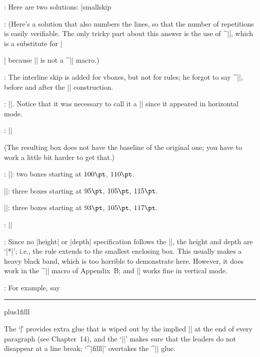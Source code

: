 {{{{{{{{{{{{{:
 Here are two solutions:
\begintt
\def\next#1\endname{\uppercase{\def\MYNAME{#1}}}
\expandafter\next\myname\endname
|smallskip\edef\next{\def\noexpand\MYNAME{\myname}}
\uppercase\expandafter{\next}
\endtt

:
 (Here's a solution that also numbers the lines, so that the number of
repetitions is easily verifiable.
The only tricky part about this answer is the use of\/ ^|\endgraf|,
which is a substitute for |\par| because |\loop| is not a ^|\long| macro.)
\begintt
\newcount\n
\def\punishment#1#2{\n=0
  \loop\ifnum\n<#2 \advance\n by1
    \item{\number\n.}#1\endgraf\repeat}
\endtt

:
 The interline skip is added for vboxes, but not for rules; he
forgot to say ^|\nointerlineskip|, before and after the |\moveright|
construction.

:
 |\vrule height3pt depth-2pt width1in|. Notice that it was necessary
to call it a |\vrule| since it appeared in horizontal mode.

:
 |\def\boxit#1{\vbox{\hrule\hbox{\vrule\kern3pt|\parbreak
        |      \vbox{\kern3pt#1\kern3pt}\kern3pt\vrule}\hrule}}|\par
\smallskip\noindent
(The resulting box does not have the baseline of the original one;
you have to work a little bit harder to get that.)

:
 |\leaders|: two boxes starting at $100\pt$, $110\pt$.\par
|\cleaders|: three boxes starting at $95\pt$, $105\pt$, $115\pt$.\par
|\xleaders|: three boxes starting at $93\pt$, $105\pt$, $117\pt$.

:
 |\def\leaderfill{\kern-0.3em\leaders\hbox to 1em{\hss.\hss}%
        |    \hskip0.6em plus1fill \kern-0.3em }|

:
 Since no |height| or |depth| specification follows the |\vrule|,
the height and depth are `|*|'; i.e., the rule extends to the smallest
enclosing box. This usually makes a heavy black band, which is too
horrible to demonstrate here. However, it does work in the ^|\downbracefill|
macro of Appendix~B\null; and |\leaders\vrule\vfill| works fine in
vertical mode.

:
 For example, say
\begintt
\null\nobreak\leaders\hrule\hskip10pt plus1filll\ \par
\endtt
The `|\|\]' provides extra glue that is wiped out by the implied |\unskip|
at the end of every paragraph (see Chapter~14), and the `|\null\nobreak|'
makes sure that the leaders do not disappear at a line break; `^|filll|'
overtakes the ^|\parfillskip| glue.

}}}}}}}}}}}}}
